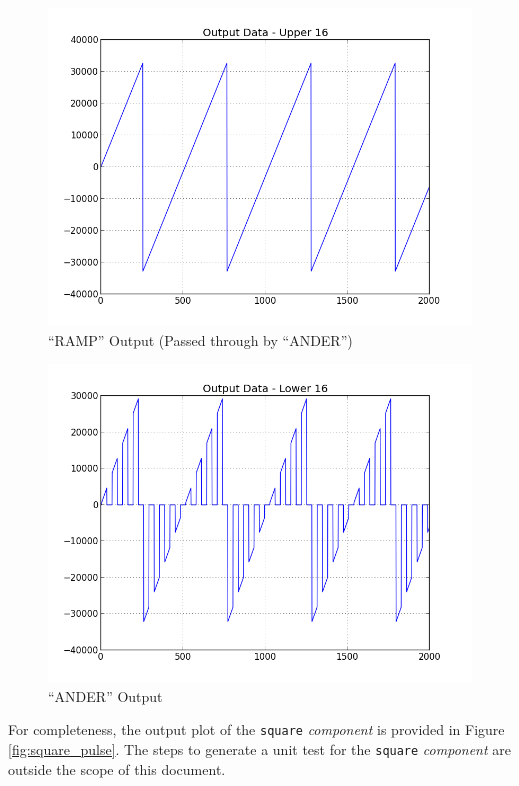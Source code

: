         \begin{figure}[H]
                \centering
                \includegraphics[scale=0.5]{./figures/upper16.jpg}
                \caption{``RAMP'' Output (Passed through by ``ANDER'')}
                \label{fig:upper16}
        \end{figure}

        \begin{figure}[H]
                \centering
                \includegraphics[scale=0.5]{./figures/lower16.jpg}
                \caption{``ANDER'' Output}
                \label{fig:lower16}
        \end{figure}
\bend
\bstart
For completeness, the output plot of the \verb+square+ \textit{component} is provided in Figure \ref{fig:square_pulse}. The steps to generate a unit test for the \verb+square+ \textit{component} are outside the scope of this document.

